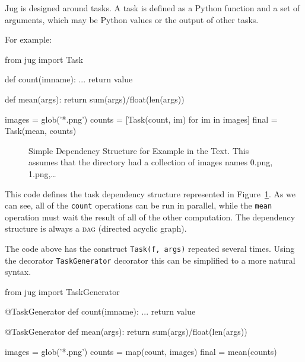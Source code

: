 \documentclass{article}
\let\code\texttt
\begin{document}
Jug is designed around tasks. A task is defined as a Python function and a set
of arguments, which may be Python values or the output of other tasks.

For example:

\begin{python}
from jug import Task

def count(imname):
    ...
    return value

def mean(args):
    return sum(args)/float(len(args))

images = glob('*.png')
counts = [Task(count, im) for im in images]
final = Task(mean, counts)
\end{python}

\begin{figure}
\begin{center}

\end{center}
\caption{Simple Dependency Structure for Example in the Text. This assumes that
the directory had a collection of images names 0.png, 1.png,\ldots}
\label{fig:jug-deps}
\end{figure}

This code defines the task dependency structure represented in
Figure~\ref{fig:jug-deps}. As we can see, all of the \code{count} operations
can be run in parallel, while the \code{mean} operation must wait the result of
all of the other computation. The dependency structure is always a \textsc{dag}
(directed acyclic graph).

The code above has the construct \code{Task(f, args)} repeated several times.
Using the decorator \code{TaskGenerator} decorator this can be simplified to a
more natural syntax.

\begin{python}
from jug import TaskGenerator

@TaskGenerator
def count(imname):
    ...
    return value

@TaskGenerator
def mean(args):
    return sum(args)/float(len(args))

images = glob('*.png')
counts = map(count, images)
final = mean(counts)
\end{python}
\end{document}

